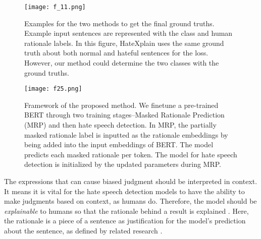 \documentclass[11pt]{article}
\begin{document}
\begin{comment}
BERT & {\begingroup\setlength{\fboxsep}{0pt} \colorbox{red!0.0}{\strut damn} \colorbox{red!0.0}{\strut right} \colorbox{red!0.0}{\strut we} \colorbox{red!0.0}{\strut are} \colorbox{red!0.0}{\strut going} \colorbox{red!0.0}{\strut to} \colorbox{red!0.0}{\strut react} \colorbox{red!0.0}{\strut when} \colorbox{red!0.0}{\strut an} \colorbox{red!0.0}{\strut <number>}  \endgroup} \\
& {\begingroup\setlength{\fboxsep}{0pt} \colorbox{red!0.0}{\strut white} \colorbox{red!0.0}{\strut country} \colorbox{red!0.0}{\strut pushes} \colorbox{red!0.0}{\strut non} \colorbox{red!0.0}{\strut white} \colorbox{red!0.0}{\strut actors} \colorbox{red!0.0}{\strut everywhere} \endgroup}\\ 

\arrayrulecolor{black} \hline
\hline

\end{tabular}
\caption{The human rationale and the LIME results with weights of each model. HX indicates HateXplain.}
\label{attention_vis1}
}
\end{table}
\end{comment}

\begin{figure}[!t]
    \centering
    \texttt{[image: f\_11.png]}
    \caption{Examples for the two methods to get the final ground truths. Example input sentences are represented with the class and human rationale labels. In this figure, HateXplain uses the same ground truth about both normal and hateful sentences for the loss. However, our method could determine the two classes with the ground truths.}
    \label{fig:my_label}
    \label{fig:long}
    \label{fig:onecol}
\label{hatexplain_mech}
\end{figure}

\begin{figure*}
\centering 
\texttt{[image: f25.png]}
\caption{Framework of the proposed method. We finetune a pre-trained BERT through two training stages--Masked Rationale Prediction (MRP) and then hate speech detection. In MRP, the partially masked rationale label is inputted as the rationale embeddings by being added into the input embeddings of BERT. The model predicts each masked rationale per token. The model for hate speech detection is initialized by the updated parameters during MRP. }
\label{model_architecture}
\end{figure*}

The expressions that can cause biased judgment should be interpreted in context. It means it is vital for the hate speech detection models to have the ability to make judgments based on context, as humans do. Therefore, the model should be \textit{explainable} to humans so that the rationale behind a result is explained \citep{liu2018towards}. Here, the rationale is a piece of a sentence as justification for the model's prediction about the sentence, as defined by related research \citep{hancock2018training, lei2016rationalizing}. 
\end{document}
